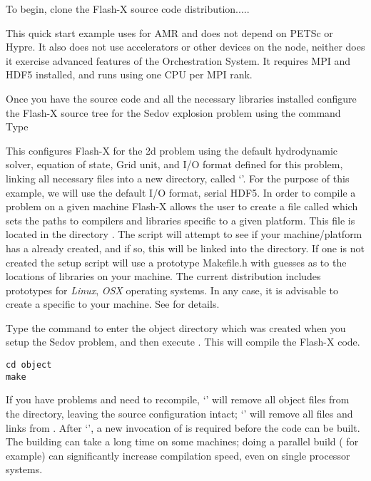 To begin, clone the Flash-X source code distribution.....

This quick start example uses \paramesh for AMR and does not depend on
PETSc or Hypre. It also does not use accelerators or other devices on
the node, neither does it exercise advanced features of the
Orchestration System. It requires MPI  and HDF5 installed, and runs
using one CPU per MPI rank.

Once you have the source code and all the necessary libraries installed
configure the Flash-X source tree for the Sedov explosion problem
using the
 command
Type \begin{quote}  \end{quote} This configures Flash-X for the 2d
problem using the default
hydrodynamic solver, equation of state, Grid unit, and I/O format
defined for this problem, linking all necessary files into a new
directory, called `'.  For the purpose of this example, we will
use the default I/O format, serial HDF5.  In order to compile a
problem on a given machine Flash-X allows the user to create a file
called
which sets the paths to compilers and libraries specific to a given
platform.  This file is located in the directory
.
The  script will
attempt to see if your machine/platform has a
already created, and if so, this will be linked into the
 directory.  If one is not created the setup script will use a 
prototype Makefile.h with guesses as to the locations of libraries on your
machine. The current distribution includes prototypes for \emph{Linux}, \emph{OSX} operating systems. In any
case, it is advisable to create a  specific to your
machine. See  
 for details.


Type the command  to enter the object directory which
was created  when you setup the Sedov problem, and then execute
. This will compile the Flash-X code. 
\begin{verbatim}
cd object
make
\end{verbatim}
If you have problems and need to recompile, `'%
will remove all object files from the  directory,
leaving the source configuration intact; `'%
will remove all files and links from .
After `', a new invocation of  is
required before the code can be built. The building can take a long
time on some machines; doing a parallel build ( for
example)%
can significantly
increase compilation speed, even on single processor systems.

